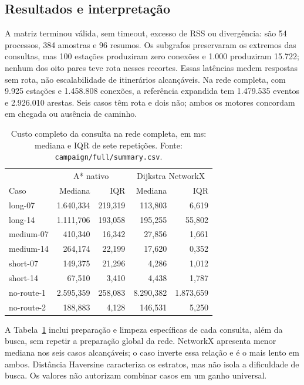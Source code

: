 \subsection{Resultados e interpretação}
A matriz terminou válida, sem timeout, excesso de RSS ou divergência: são 54 processos, 384 amostras e 96 resumos. Os subgrafos preservaram os extremos das consultas, mas 100 estações produziram zero conexões e 1.000 produziram 15.722; nenhum dos oito pares teve rota nesses recortes. Essas latências medem respostas sem rota, não escalabilidade de itinerários alcançáveis. Na rede completa, com 9.925 estações e 1.458.808 conexões, a referência expandida tem 1.479.535 eventos e 2.926.010 arestas. Seis casos têm rota e dois não; ambos os motores concordam em chegada ou ausência de caminho.

\begin{table}[ht]
\centering
\caption{Custo completo da consulta na rede completa, em ms: mediana e IQR de sete repetições. Fonte: \texttt{campaign/full/summary.csv}.}
\label{tab:query-benchmark}
\begin{tabular}{@{}lrrrr@{}}
\toprule
& \multicolumn{2}{c}{A* nativo} & \multicolumn{2}{c}{Dijkstra NetworkX} \\
Caso & Mediana & IQR & Mediana & IQR \\
\midrule
long-07 & 1.640,334 & 219,319 & 113,803 & 6,619 \\
long-14 & 1.111,706 & 193,058 & 195,255 & 55,802 \\
medium-07 & 410,340 & 16,342 & 27,856 & 1,661 \\
medium-14 & 264,174 & 22,199 & 17,620 & 0,352 \\
short-07 & 149,375 & 21,296 & 4,286 & 1,012 \\
short-14 & 67,510 & 3,410 & 4,438 & 1,787 \\
no-route-1 & 2.595,359 & 258,083 & 8.290,382 & 1.873,659 \\
no-route-2 & 188,883 & 4,128 & 146,531 & 5,250 \\
\bottomrule
\end{tabular}
\end{table}

A Tabela~\ref{tab:query-benchmark} inclui preparação e limpeza específicas de cada consulta, além da busca, sem repetir a preparação global da rede. NetworkX apresenta menor mediana nos seis casos alcançáveis; o caso  inverte essa relação e é o mais lento em ambos. Distância Haversine caracteriza os estratos, mas não isola a dificuldade de busca. Os valores não autorizam combinar casos em um ganho universal.


